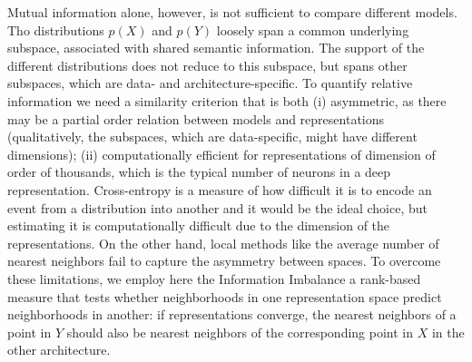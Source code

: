 \documentclass[10pt]{article} %
\begin{document}
Mutual information alone, however, is not sufficient to compare
different models. 
 Tho distributions $p(X)$ and $p(Y)$ loosely span a common  underlying subspace, associated with shared semantic information. The support of the different distributions does not reduce to this subspace, but spans other subspaces, which are data- and architecture-specific. To quantify relative information we need a similarity criterion that is both (i) asymmetric, as there may be a partial order relation between models and representations (qualitatively, the subspaces, which are data-specific, might have different dimensions); (ii) computationally efficient for representations of dimension of order of thousands, which is the typical number of neurons in a deep representation. Cross-entropy is a measure of how difficult it is to encode an event from a distribution into another and it would be the ideal choice, but estimating it is computationally difficult due to the dimension of the representations. On the other hand, local methods like the average number of nearest neighbors \citep{doimo2020,platonic_hypothesis} fail to capture the asymmetry between spaces. To overcome these limitations, we employ here the Information Imbalance \citep{II} a rank-based measure that tests whether
neighborhoods in one representation space predict neighborhoods in
another: if representations converge, the nearest neighbors of a
point in $Y$ should also be nearest neighbors of the corresponding
point in $X$ in the other architecture.
\end{document}
